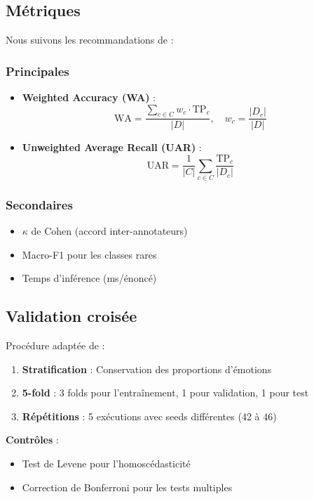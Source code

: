\documentclass[a4paper,11pt]{article}
\begin{document}
\subsection{Métriques}
Nous suivons les recommandations de \cite{schuller2013interspeech} :

\subsubsection{Principales}
\begin{itemize}
    \item \textbf{Weighted Accuracy (WA)} : 
    \[
    \text{WA} = \frac{\sum_{c \in C} w_c \cdot \text{TP}_c}{|D|}, \quad w_c = \frac{|D_c|}{|D|}
    \]
    
    \item \textbf{Unweighted Average Recall (UAR)} :
    \[
    \text{UAR} = \frac{1}{|C|} \sum_{c \in C} \frac{\text{TP}_c}{|D_c|}
    \]
\end{itemize}

\subsubsection{Secondaires}
\begin{itemize}
    \item $\kappa$ de Cohen (accord inter-annotateurs) \cite{artstein2008inter}
    \item Macro-F1 pour les classes rares \cite{opitz2019macro}
    \item Temps d'inférence (ms/énoncé) \cite{wang2020efficiency}
\end{itemize}

\subsection{Validation croisée}
Procédure adaptée de \cite{rodriguez2010cross} :

\begin{enumerate}
    \item \textbf{Stratification} : Conservation des proportions d'émotions
    \item \textbf{5-fold} : 3 folds pour l'entraînement, 1 pour validation, 1 pour test
    \item \textbf{Répétitions} : 5 exécutions avec seeds différentes (42 à 46)
\end{enumerate}

\textbf{Contrôles} :
\begin{itemize}
    \item Test de Levene pour l'homoscédasticité \cite{levene1960robust}
    \item Correction de Bonferroni pour les tests multiples \cite{abdi2007bonferroni}
\end{itemize}
\end{document}
